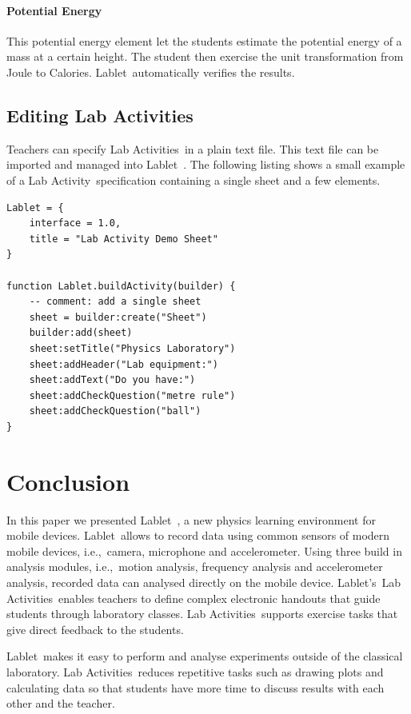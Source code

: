 \documentclass{sigchi}
\newcommand{\ie}{i.e.,\ }
\newcommand{\lablet}{Lablet\ }
\newcommand{\lablets}{Lablet's\ }
\newcommand{\labactivity}{Lab Activity\ }
\newcommand{\labactivities}{Lab Activities\ }
\begin{document}
\paragraph{Potential Energy}
This potential energy element let the students estimate the potential energy of a mass at a certain height.
The student then exercise the unit transformation from Joule to Calories.
\lablet automatically verifies the results.

\subsection{Editing Lab Activities}
Teachers can specify \labactivities in a plain text file.
This text file can be imported and managed into \lablet.
The following listing shows a small example of a \labactivity specification containing a single sheet and a few elements.

\begin{lstlisting}
Lablet = {
    interface = 1.0,
    title = "Lab Activity Demo Sheet"
}
 
function Lablet.buildActivity(builder) {
    -- comment: add a single sheet
    sheet = builder:create("Sheet")
    builder:add(sheet)
    sheet:setTitle("Physics Laboratory")
    sheet:addHeader("Lab equipment:")
    sheet:addText("Do you have:")
    sheet:addCheckQuestion("metre rule")
    sheet:addCheckQuestion("ball")
}
\end{lstlisting}

\section{Conclusion}
In this paper we presented \lablet, a new physics learning environment for mobile devices.
\lablet allows to record data using common sensors of modern mobile devices, \ie camera, microphone and accelerometer.
Using three build in analysis modules, \ie motion analysis, frequency analysis and accelerometer analysis, recorded data can analysed directly on the mobile device.
\lablets \labactivities enables teachers to define complex electronic handouts that guide students through laboratory classes.
\labactivities supports exercise tasks that give direct feedback to the students.

\lablet makes it easy to perform and analyse experiments outside of the classical laboratory.
\labactivities reduces repetitive tasks such as drawing plots and calculating data so that students have more time to discuss results with each other and the teacher.
\end{document}
